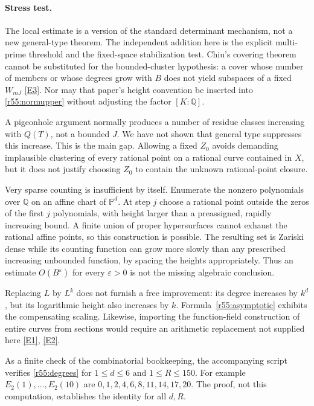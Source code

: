 \documentclass[11pt,a4paper]{article}
\newcommand{\Q}{\mathbb{Q}}
\newcommand{\eref}[2]{\hyperlink{extra:#1:#2}{[E#2]}}
\numberwithin{equation}{section}
\begin{document}
\paragraph{Stress test.}
The local estimate is a version of the standard determinant mechanism, not a new general-type theorem. The independent addition here is the explicit multi-prime threshold and the fixed-space stabilization test. Chiu's covering theorem cannot be substituted for the bounded-cluster hypothesis: a cover whose number of members or whose degrees grow with $B$ does not yield subspaces of a fixed $W_{mJ}$ \eref{statement}{3}. Nor may that paper's height convention be inserted into \eqref{r55:normupper} without adjusting the factor $[K:\Q]$.

A pigeonhole argument normally produces a number of residue classes increasing with $Q(T)$, not a bounded $J$. We have not shown that general type suppresses this increase. This is the main gap. Allowing a fixed $Z_0$ avoids demanding implausible clustering of every rational point on a rational curve contained in $X$, but it does not justify choosing $Z_0$ to contain the unknown rational-point closure.

Very sparse counting is insufficient by itself. Enumerate the nonzero polynomials over $\Q$ on an affine chart of $\mathbb P^d$. At step $j$ choose a rational point outside the zeros of the first $j$ polynomials, with height larger than a preassigned, rapidly increasing bound. A finite union of proper hypersurfaces cannot exhaust the rational affine points, so this construction is possible. The resulting set is Zariski dense while its counting function can grow more slowly than any prescribed increasing unbounded function, by spacing the heights appropriately. Thus an estimate $O(B^\varepsilon)$ for every $\varepsilon>0$ is not the missing algebraic conclusion.

Replacing $L$ by $L^k$ does not furnish a free improvement: its degree increases by $k^d$, but its logarithmic height also increases by $k$. Formula~\eqref{r55:asymptotic} exhibits the compensating scaling. Likewise, importing the function-field construction of entire curves from sections would require an arithmetic replacement not supplied here \eref{statement}{1}, \eref{statement}{2}.

As a finite check of the combinatorial bookkeeping, the accompanying script verifies \eqref{r55:degrees} for $1\leq d\leq6$ and $1\leq R\leq150$. For example $E_2(1),\ldots,E_2(10)$ are $0,1,2,4,6,8,11,14,17,20$. The proof, not this computation, establishes the identity for all $d,R$.
\end{document}
